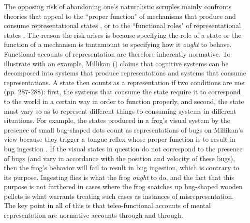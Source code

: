 The opposing risk of abandoning one's naturalistic scruples mainly confronts theories that appeal to the ``proper function" of mechanisms that produce and consume representational states \citep{Millikan:1989,Millikan:2005,Dretske:1986}, or to the ``functional roles" of representational states \citep{Block:1986,Harman:1982,Eliasmith:2000}. The reason the risk arises is because specifying the role of a state or the function of a mechanism is tantamount to specifying how it \textit{ought} to behave. Functional accounts of representation are therefore inherently normative. To illustrate with an example, Millikan (\citeyear{Millikan:1989}) claims that cognitive systems can be decomposed into systems that produce representations and systems that consume representations. A state then counts as a representation if two conditions are met (pp. 287-288): first, the systems that consume the state require it to correspond to the world in a certain way in order to function properly, and second, the state must vary so as to represent different things to consuming systems in different situations. For example, the states produced in a frog's visual system by the presence of small bug-shaped dots count as representations of bugs on Millikan's view because they trigger a tongue reflex whose proper function is to result in bug ingestion \citep[][p. 291]{Millikan:1989}. If the visual states in question do not correspond to the presence of bugs (and vary in accordance with the position and velocity of these bugs), then the frog's behavior will fail to result in bug ingestion, which is contrary to its purpose. Ingesting flies is what the frog \textit{ought} to do, and the fact that this purpose is not furthered in cases where the frog snatches up bug-shaped wooden pellets is what warrants treating such cases as instances of misrepresentation. The key point in all of this is that teleo-functional accounts of mental representation are normative accounts through and through. 

